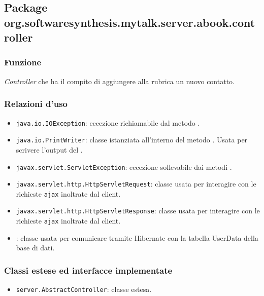 \subsection{Package org.softwaresynthesis.mytalk.server.abook.controller}\label{sec:call}



\subsubsection*{Funzione}
\textit{Controller} che ha il compito di aggiungere alla rubrica un nuovo contatto.

\subsubsection*{Relazioni d'uso}

\begin{itemize}
	\item \texttt{java.io.IOException}: eccezione richiamabile dal metodo .
	\item \texttt{java.io.PrintWriter}: classe istanziata all'interno del metodo . Usata per scrivere l'output del .
	\item \texttt{javax.servlet.ServletException}: eccezione sollevabile dai metodi .
	\item \texttt{javax.servlet.http.HttpServletRequest}: classe usata per interagire con le richieste \texttt{ajax} inoltrate dal client.
	\item \texttt{javax.servlet.http.HttpServletResponse}: classe usata per interagire con le richieste \texttt{ajax} inoltrate dal client.
	\item {}: classe usata per comunicare tramite Hibernate con la tabella UserData della base di dati.
\end{itemize}

\subsubsection*{Classi estese ed interfacce implementate}
\begin{itemize}
	\item \texttt{server.AbstractController}: classe estesa.
\end{itemize}

